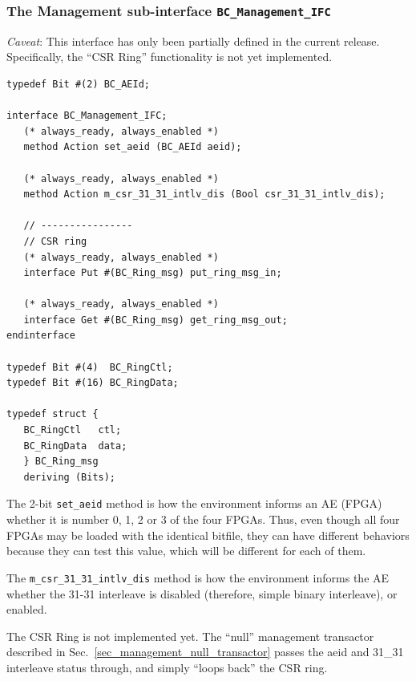 \documentclass[twoside,letterpaper,11pt]{article}
\begin{document}

\subsubsection{The Management sub-interface {\tt BC\_Management\_IFC}}

\label{sec_managementt_ifc}
 
\emph{Caveat}: This interface has only been partially defined in the
current release.  Specifically, the ``CSR Ring'' functionality is not
yet implemented.

\begin{Verbatim}[frame=single, label=BC\_HW\_IFC.bsv]  
typedef Bit #(2) BC_AEId;

interface BC_Management_IFC;
   (* always_ready, always_enabled *)
   method Action set_aeid (BC_AEId aeid);

   (* always_ready, always_enabled *)
   method Action m_csr_31_31_intlv_dis (Bool csr_31_31_intlv_dis);

   // ----------------
   // CSR ring
   (* always_ready, always_enabled *)
   interface Put #(BC_Ring_msg) put_ring_msg_in;

   (* always_ready, always_enabled *)
   interface Get #(BC_Ring_msg) get_ring_msg_out;
endinterface

typedef Bit #(4)  BC_RingCtl;
typedef Bit #(16) BC_RingData;

typedef struct {
   BC_RingCtl   ctl;
   BC_RingData  data;
   } BC_Ring_msg
   deriving (Bits);
\end{Verbatim}
The 2-bit \verb|set_aeid| method is how the environment informs an AE
(FPGA) whether it is number 0, 1, 2 or 3 of the four FPGAs.  Thus,
even though all four FPGAs may be loaded with the identical bitfile,
they can have different behaviors because they can test this value,
which will be different for each of them.

The \verb|m_csr_31_31_intlv_dis| method is how the environment informs
the AE whether the 31-31 interleave is disabled (therefore, simple
binary interleave), or enabled.

The CSR Ring is not implemented yet.  The ``null'' management
transactor described in Sec.~\ref{sec_management_null_transactor}
passes the aeid and 31\_31 interleave status through, and simply ``loops
back'' the CSR ring.

\end{document}
